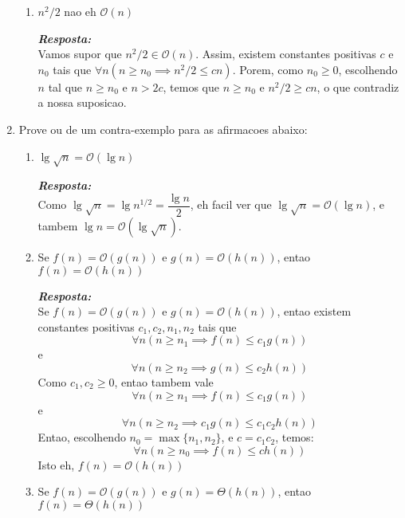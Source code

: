 \documentclass{article}
\begin{document}
\begin{enumerate}[itemsep=3ex, label=\textbf{\arabic*}.]
\begin{enumerate}
        \item
        $n^2/2$ nao eh $\mathcal{O}(n)$
        
        \textit{\textbf{Resposta:}}\\
        Vamos supor que $n^2/2 \in \mathcal{O}(n)$. Assim, existem constantes positivas $c$ e $n_0$ tais que $\forall n (n \geq n_0 \implies n^2/2 \leq c n)$.
        Porem, como $n_0 \geq 0$, escolhendo $n$ tal que $n \geq n_0$ e $n > 2c$, temos que $n \geq n_0$ e $n^2/2 \geq cn$, o que contradiz a nossa suposicao.
        
    \end{enumerate}
    
    \item
    Prove ou de um contra-exemplo para as afirmacoes abaixo:
    \begin{enumerate}
        \item
        $\lg{\sqrt{n}} = \mathcal{O}(\lg n)$
        
        \textit{\textbf{Resposta:}}\\
        Como $\lg{\sqrt{n}} = \lg{n^{1/2}} = \dfrac{\lg{n}}{2}$, eh facil ver que $\lg{\sqrt{n}} = \mathcal{O}(\lg n)$, e tambem $\lg n =  \mathcal{O}(\lg{\sqrt{n}})$.
        
        \item \label{item2}
        Se $f(n) = \mathcal{O}(g(n))$ e $g(n) = \mathcal{O}(h(n))$, entao $f(n) = \mathcal{O}(h(n))$
         
        \textit{\textbf{Resposta:}}\\
        Se $f(n) = \mathcal{O}(g(n))$ e $g(n) = \mathcal{O}(h(n))$, entao existem constantes positivas $c_1, c_2, n_1, n_2$ tais que 
        $$
        \forall n (n \geq n_1 \implies f(n) \leq c_1 g(n))
        $$
        e
        $$
        \forall n (n \geq n_2 \implies g(n) \leq c_2 h(n))
        $$
        Como $c_1, c_2 \geq 0$, entao tambem vale
        $$
        \forall n (n \geq n_1 \implies f(n) \leq c_1 g(n))
        $$
        e
        $$
        \forall n (n \geq n_2 \implies c_1 g(n) \leq c_1 c_2 h(n))
        $$
        Entao, escolhendo $n_0 = \max\{n_1, n_2\}$, e $c = c_1 c_2$, temos:
        $$
        \forall n (n \geq n_0 \implies f(n) \leq c h(n))
        $$
        Isto eh, $f(n) = \mathcal{O}(h(n))$\\
        
        \item
        Se $f(n) = \mathcal{O}(g(n))$ e $g(n) = \Theta(h(n))$, entao $f(n) = \Theta(h(n))$
         

\end{enumerate}
\end{enumerate}
\end{document}
